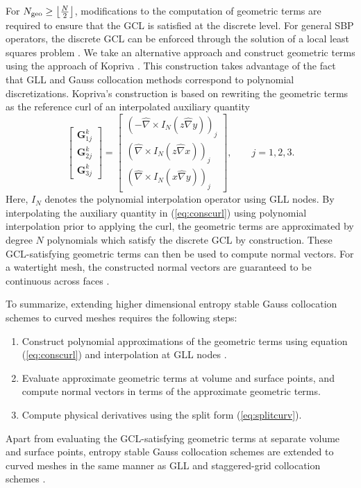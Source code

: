 \documentclass[onefignum,onetabnum,final]{siamart171218}
\renewcommand{\hat}{\widehat}
\newcommand{\LRp}[1]{\left( #1 \right)}
\newcommand{\Grad} {\ensuremath{\nabla}}
\begin{document}
For $N_{\rm geo} \geq \left\lfloor\frac{N}{2}\right\rfloor$, modifications to the computation of geometric terms are required to ensure that the GCL is satisfied at the discrete level.  For general SBP operators, the discrete GCL can be enforced through the solution of a local least squares problem \cite{crean2018entropy}.  We take an alternative approach and  construct geometric terms using the approach of Kopriva \cite{kopriva2006metric}.  This construction takes advantage of the fact that GLL and Gauss collocation methods correspond to polynomial discretizations.  Kopriva's construction is based on rewriting the geometric terms as the reference curl of an interpolated auxiliary quantity
\begin{equation}
\begin{bmatrix}
\bm{G}^k_{1j}\\
\bm{G}^k_{2j}\\
\bm{G}^k_{3j}
\end{bmatrix} = \begin{bmatrix}
\LRp{-\hat{\Grad} \times I_N\LRp{z\hat{\Grad}y}}_j\\
\LRp{\hat{\Grad} \times I_N\LRp{z\hat{\Grad}x}}_j\\
\LRp{\hat{\Grad} \times I_N\LRp{x\hat{\Grad}y}}_j
\end{bmatrix}, \qquad j = 1,2,3.
\label{eq:conscurl}
\end{equation}
Here, $I_N$ denotes the polynomial interpolation operator using GLL nodes.  By interpolating the auxiliary quantity in (\ref{eq:conscurl}) using polynomial interpolation prior to applying the curl, the geometric terms are approximated by degree $N$ polynomials which satisfy the discrete GCL by construction.  These GCL-satisfying geometric terms can then be used to compute normal vectors.  For a watertight mesh, the constructed normal vectors are guaranteed to be continuous across faces \cite{chan2018discretely}.  %

To summarize, extending higher dimensional entropy stable Gauss collocation schemes to curved meshes requires the following steps: 
\begin{enumerate}
\item Construct polynomial approximations of the geometric terms using equation (\ref{eq:conscurl}) and interpolation at GLL nodes \cite{kopriva2006metric}.  
\item Evaluate approximate geometric terms at volume and surface points, and compute normal vectors in terms of the approximate geometric terms.  
\item Compute physical derivatives using the split form (\ref{eq:splitcurv}).  
\end{enumerate}
Apart from evaluating the GCL-satisfying geometric terms at separate volume and surface points, entropy stable Gauss collocation schemes are extended to curved meshes in the same manner as GLL and staggered-grid collocation schemes \cite{carpenter2014entropy, parsani2016entropy, chan2018discretely}.  
\end{document}

